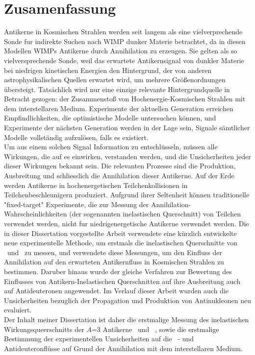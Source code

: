 

\section*{Zusamenfassung}\label{sec:preface_de}



Antikerne in Kosmischen Strahlen werden seit langem als eine vielverprechende Sonde f\”ur indirekte Suchen nach WIMP dunker Materie betrachtet, da in diesen Modellen WIMPs Antikerne durch Annihilation zu erzeugen. Sie gelten als so vielversprechende Sonde, weil das erwartete Antikernsignal von dunkler Materie bei niedrigen kinetischen Energien den Hintergrund, der von anderen astrophysikalischen Quellen erwartet wird, um mehrere Gr\"oßenordnungen \"ubersteigt. Tats\"achlich wird nur eine einzige relevante Hintergrundquelle in Betracht gezogen: der Zusammenstoß von Hochenergie-Kosmischen Strahlen mit dem interstellaren Medium. Experimente der aktuellen Generation erreichen Empfindlichkeiten, die optimistische Modelle untersuchen k\"onnen, und Experimente der n\"achsten Generation werden in der Lage sein, Signale s\"amtlicher Modelle vollst\"andig aufzul\"osen, falls es existiert.\\
Um aus einem solchen Signal Information zu entschl\"usseln, m\"ussen alle Wirkungen, die auf es einwirken, verstanden werden, und die Unsicherheiten jeder dieser Wirkungen bekannt sein. Die relevanten Prozesse sind die Produktion, Ausbreitung und schliesslich die Annihilation dieser Antikerne. Auf der Erde werden Antikerne in hochenergetischen Teilchenkollisionen in Teilchenbeschleunigern produziert. Aufgrund ihrer Seltenheit k\"onnen traditionelle "fixed-target" Experimente, die zur Messung der Annihilation-Wahrscheinlichkeiten (der sogenannten inelastischen Querschnitt) von Teilchen verwendet werden, nicht f\”ur niedrigenergetische Antikerne verwendet werden. Die in dieser Dissertation vorgestellte Arbeit verwendete eine k\"urzlich entwickelte neue experimentelle Methode, um erstmals die inelastischen Querschnitte von \ahe\ und \atrit\ zu messen, und verwendete diese Messungen, um den Einfluss der Annihilation auf den erwarteten Antikernfluss in Kosmischen Strahlen zu bestimmen. Dar\”uber hinaus wurde der gleiche Verfahren zur Bewertung des Einflusses von Antikern-Inelastischen Querschnitten auf ihre Ausbreitung auch auf Antideuteronen angewendet. Im Verlauf dieser Arbeit wurden auch die Unsicherheiten bez\”uglich der Propagation und Produktion von Antinukleonen neu evaluiert.\\
Der Inhalt meiner Dissertation ist daher die erstmalige Messung des inelastischen Wirkungsqueerschnitts der $A$=3 Antikerne \ahe\ und \atrit\ , sowie die erstmalige Bestimmung der experimentellen Unsicherheiten auf die \ahe\ - und Antideuteronfl\"usse auf Grund der Annihilation mit dem interstellaren Medium.  
\newpage
